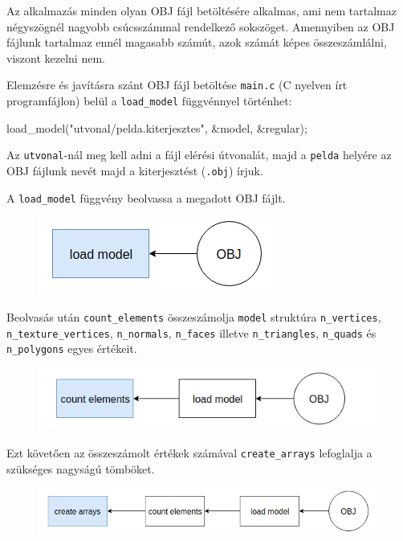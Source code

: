 
Az alkalmazás minden olyan OBJ fájl betöltésére alkalmas, ami nem tartalmaz négyszögnél nagyobb csúcsszámmal rendelkező sokszöget. Amennyiben az OBJ fájlunk tartalmaz ennél magasabb számút, azok számát képes összeszámlálni, viszont kezelni nem.

Elemzésre és javításra szánt OBJ fájl betöltése \texttt{main.c} (C nyelven írt programfájlon) belül a \texttt{load\_model} függvénnyel történhet:
\begin{cpp}
load_model("utvonal/pelda.kiterjesztes", &model, &regular);
\end{cpp}
Az \texttt{utvonal}-nál meg kell adni a fájl elérési útvonalát, majd a \texttt{pelda} helyére az OBJ fájlunk nevét majd a kiterjesztést (\texttt{.obj}) írjuk.


A \texttt{load\_model} függvény beolvassa a megadott OBJ fájlt.
\begin{figure}[h]
\centering
\includegraphics[scale=0.5]{images/load.png}
\end{figure}
\bigskip

Beolvasás után \texttt{count\_elements} összeszámolja \texttt{model} struktúra \texttt{n\_vertices},  \texttt{\\n\_texture\_vertices}, \texttt{n\_normals}, \texttt{n\_faces} illetve \texttt{n\_triangles}, \texttt{n\_quads} és \\ \texttt{n\_\-polygons} egyes értékeit.
\begin{figure}[h]
\centering
\includegraphics[scale=0.5]{images/count.png}
\end{figure}

Ezt követően az összeszámolt értékek számával \texttt{create\_arrays} lefoglalja a szükséges nagyságú tömböket.
\begin{figure}[h]
\centering
\includegraphics[scale=0.5]{images/create.png}
\end{figure}

